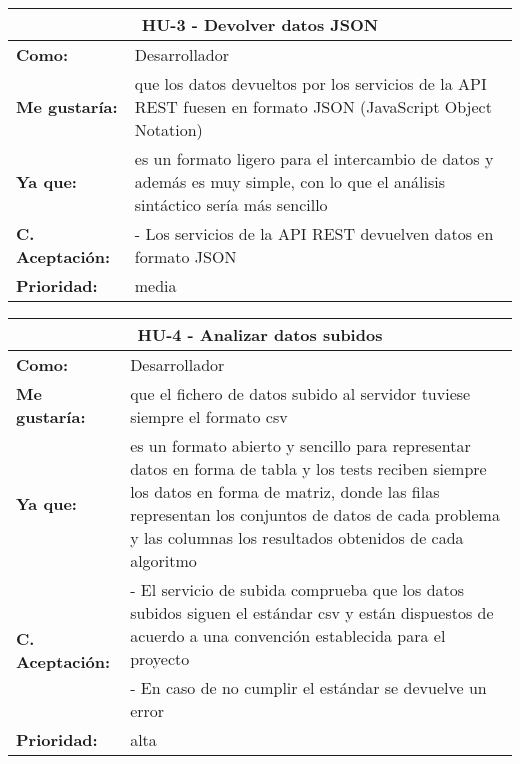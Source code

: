 
\begin{table}[H]
	\begin{tabular}{| p{3cm}| p{12cm} |}
		\hline
		\multicolumn{2}{|c|}{\textbf{HU-3} - Devolver datos JSON} \\ \hline
		\textbf{Como:} & Desarrollador \\ \hline
		\textbf{Me gustaría:} & que los datos devueltos por los servicios de la API REST fuesen en formato JSON (JavaScript Object Notation) \\ \hline
		\textbf{Ya que:} & es un formato ligero para el intercambio de datos y además es muy simple, con lo que el análisis sintáctico sería más sencillo \\ \hline
		\textbf{C. Aceptación:} & - Los servicios de la API REST devuelven datos en formato JSON \\ \hline
		\textbf{\textbf{Prioridad:}} & media \\ \hline
	\end{tabular}
\end{table}


\begin{table}[H]
	\begin{tabular}{| p{3cm}| p{12cm} |}
		\hline
		\multicolumn{2}{|c|}{\textbf{HU-4} - Analizar datos subidos} \\ \hline
		\textbf{Como:} & Desarrollador \\ \hline
		\textbf{Me gustaría:} & que el fichero de datos subido al servidor tuviese siempre el formato csv \\ \hline
		\textbf{Ya que:} & es un formato abierto y sencillo para representar datos en forma de tabla y los tests reciben siempre los datos en forma de matriz, donde las filas representan los conjuntos de datos de cada problema y las columnas los resultados obtenidos de cada algoritmo \\ \hline
		\multirow{2}{12cm}{\textbf{C. Aceptación:}} & - El servicio de subida comprueba que los datos subidos siguen el estándar csv y están dispuestos de acuerdo a una convención establecida para el proyecto \\
		& - En caso de no cumplir el estándar se devuelve un error \\ \hline 
		\textbf{\textbf{Prioridad:}} & alta \\ \hline
	\end{tabular}
\end{table}
	
